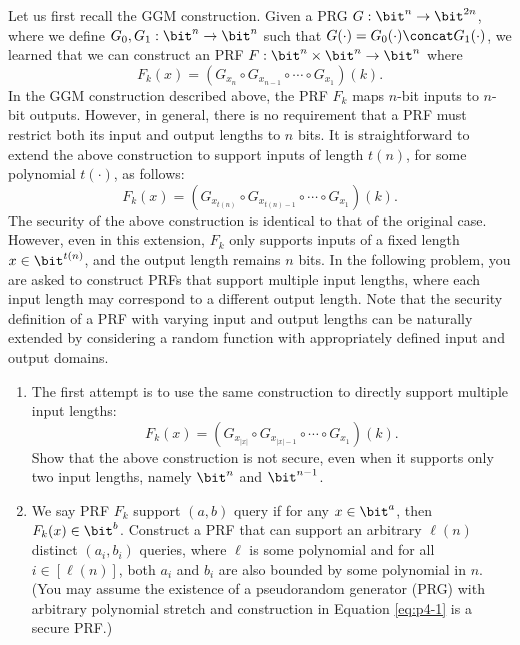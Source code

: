\begin{problem}\label{p4}
    \leavevmode\par
    Let us first recall the GGM construction. Given a PRG $G:\bit^n\to\bit^{2n}$, where we define $G_0,G_1:\bit^n\to\bit^n$ such that $G(\cdot)=G_0(\cdot)\concat G_1(\cdot)$, we learned that we can construct an PRF $F:\bit^n\times\bit^n\to\bit^n$ where
    \[
        F_k(x) = (G_{x_n}\circ G_{x_{n-1}}\circ \cdots\circ G_{x_1})(k).
    \]
    In the GGM construction described above, the PRF $F_k$ maps $n$-bit inputs to $n$-bit outputs. However, in general, there is no requirement that a PRF must restrict both its input and output lengths to $n$ bits. It is straightforward to extend the above construction to support inputs of length $t(n)$, for some polynomial $t(\cdot)$, as follows:
    \begin{equation}\label{eq:p4-1}
        F_k(x) = (G_{x_{t(n)}}\circ G_{x_{t(n)-1}}\circ \cdots\circ G_{x_1})(k).
    \end{equation}
    The security of the above construction is identical to that of the original case. However, even in this extension, $F_k$ only supports inputs of a fixed length $x\in\bit^{t(n)}$, and the output length remains $n$ bits. In the following problem, you are asked to construct PRFs that support multiple input lengths, where each input length may correspond to a different output length. Note that the security definition of a PRF with varying input and output lengths can be naturally extended by considering a random function with appropriately defined input and output domains.
    \begin{enumerate}[label=(\alph*)]
        \item The first attempt is to use the same construction to directly support multiple input lengths:
        \[
            F_k(x) = (G_{x_{|x|}}\circ G_{x_{|x|-1}}\circ \cdots\circ G_{x_1})(k).
        \]
        Show that the above construction is not secure, even when it supports only two input lengths, namely $\bit^n$ and $\bit^{n-1}$.
        \item We say PRF $F_k$ support $(a, b)$ query if for any $x \in\bit^a$, then $F_k(x) \in\bit^b$. Construct a PRF that can support an arbitrary $\ell(n)$ distinct $(a_i,b_i)$ queries, where $\ell$ is some polynomial and for all $i\in[\ell(n)]$, both $a_i$ and $b_i$ are also bounded by some polynomial in $n$. (You may assume the existence of a pseudorandom generator (PRG) with arbitrary polynomial stretch and construction in Equation \eqref{eq:p4-1} is a secure PRF.)
    \end{enumerate}
\end{problem}



